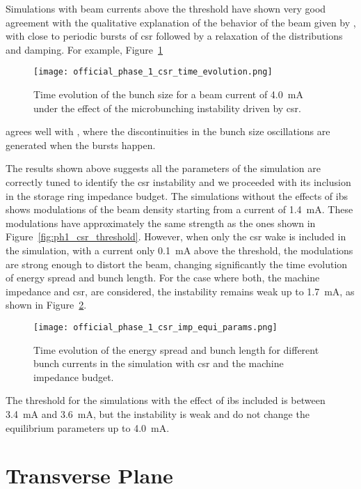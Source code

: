     Simulations with beam currents above the threshold have shown very good agreement with the qualitative explanation of the behavior of the beam given by , with close to periodic bursts of \gls{csr} followed by a relaxation of the distributions and damping. For example, Figure~\ref{fig:ph1_csr_time_evolution}
    \begin{figure}
        \centering
        \texttt{[image: official\_phase\_1\_csr\_time\_evolution.png]}
        \caption{Time evolution of the bunch size for a beam current of \SI{4.0}{\milli\ampere} under the effect of the microbunching instability driven by \gls{csr}.}
        \label{fig:ph1_csr_time_evolution}
    \end{figure}
    agrees well with \cite[Fig. 2]{Venturini2002}, where the discontinuities in the bunch size oscillations are generated when the bursts happen.

    The results shown above suggests all the parameters of the simulation are correctly tuned to identify the \gls{csr} instability and we proceeded with its inclusion in the storage ring impedance budget. The simulations without the effects of \gls{ibs} shows modulations of the beam density starting from a current of \SI{1.4}{\milli\ampere}. These modulations have approximately the same strength as the ones shown in Figure~\ref{fig:ph1_csr_threshold}. However, when only the \gls{csr} wake is included in the simulation, with a current only \SI{0.1}{\milli\ampere} above the threshold, the modulations are strong enough to distort the beam, changing significantly the time evolution of energy spread and bunch length. For the case where both, the machine impedance and \gls{csr}, are considered, the instability remains weak up to \SI{1.7}{\milli\ampere}, as shown in Figure~\ref{fig:ph1_csr_imp_equi_params}.
    \begin{figure}
        \centering
        \texttt{[image: official\_phase\_1\_csr\_imp\_equi\_params.png]}
        \caption{Time evolution of the energy spread and bunch length for different bunch currents in the simulation with \gls{csr} and the machine impedance budget.}
        \label{fig:ph1_csr_imp_equi_params}
    \end{figure}
    The threshold for the simulations with the effect of \gls{ibs} included is between \SI{3.4}{\milli\ampere} and \SI{3.6}{\milli\ampere}, but the instability is weak and do not change the equilibrium parameters up to \SI{4.0}{\milli\ampere}.

\section{Transverse Plane}

